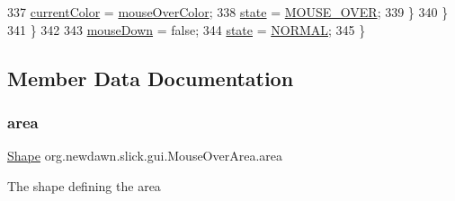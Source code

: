 \begin{DoxyCode}
337                     \mbox{\hyperlink{classorg_1_1newdawn_1_1slick_1_1gui_1_1_mouse_over_area_a57b4335d9de8d2c3051689c9e0f69173}{currentColor}} = \mbox{\hyperlink{classorg_1_1newdawn_1_1slick_1_1gui_1_1_mouse_over_area_ad12811ff53af05cc21b12795179f6132}{mouseOverColor}};
338                     \mbox{\hyperlink{classorg_1_1newdawn_1_1slick_1_1gui_1_1_mouse_over_area_afdec7c9ac6811ff02b1c51cc35da4a41}{state}} = \mbox{\hyperlink{classorg_1_1newdawn_1_1slick_1_1gui_1_1_mouse_over_area_a8565884b79f0f79cccaeaf2d862f7dae}{MOUSE\_OVER}};
339                 \}
340             \}
341         \}
342 
343         \mbox{\hyperlink{classorg_1_1newdawn_1_1slick_1_1gui_1_1_mouse_over_area_ad1eb1ead0d2c6b907c4b4d4a297da2c0}{mouseDown}} = \textcolor{keyword}{false};
344         \mbox{\hyperlink{classorg_1_1newdawn_1_1slick_1_1gui_1_1_mouse_over_area_afdec7c9ac6811ff02b1c51cc35da4a41}{state}} = \mbox{\hyperlink{classorg_1_1newdawn_1_1slick_1_1gui_1_1_mouse_over_area_a807ff20c977a970752b65cf6bd22d509}{NORMAL}};
345     \}
\end{DoxyCode}


\subsection{Member Data Documentation}
\mbox{\label{classorg_1_1newdawn_1_1slick_1_1gui_1_1_mouse_over_area_a8104ad89fbe457da294da3285b7a3268}} 
\subsubsection{\texorpdfstring{area}{area}}
{\footnotesize\ttfamily \mbox{\hyperlink{classorg_1_1newdawn_1_1slick_1_1geom_1_1_shape}{Shape}} org.\+newdawn.\+slick.\+gui.\+Mouse\+Over\+Area.\+area\hspace{0.3cm}{\ttfamily [private]}}

The shape defining the area \mbox{\label{classorg_1_1newdawn_1_1slick_1_1gui_1_1_mouse_over_area_a57b4335d9de8d2c3051689c9e0f69173}} 
